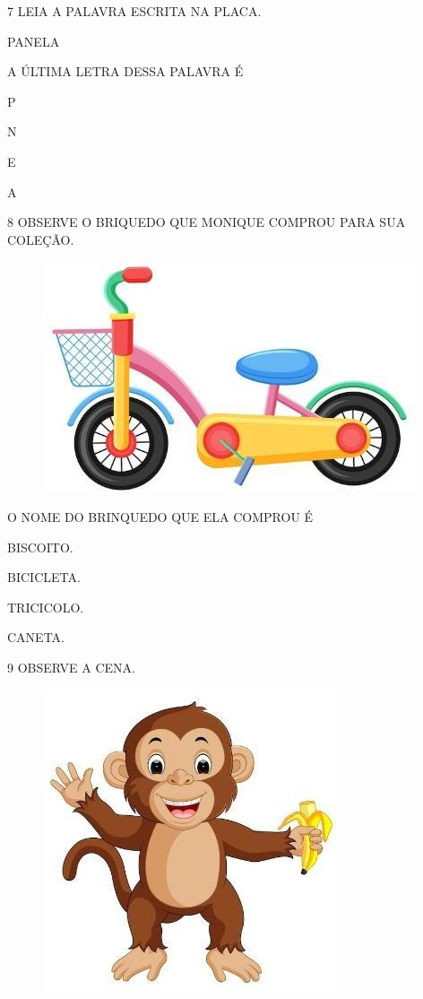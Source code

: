 \num{7} LEIA A PALAVRA ESCRITA NA PLACA.

\begin{myquote}
PANELA
\end{myquote}

A ÚLTIMA LETRA DESSA PALAVRA É

\begin{escolha}
\item P

\item N

\item E

\item A
\end{escolha}

\pagebreak

\num{8} OBSERVE O BRIQUEDO QUE MONIQUE COMPROU PARA SUA COLEÇÃO.

\begin{figure}[htpb]
\centering
\includegraphics[width=.3\textwidth]{media/image217.jpg}
\end{figure}

O NOME DO BRINQUEDO QUE ELA COMPROU É

\begin{escolha}
\item BISCOITO.

\item BICICLETA.

\item TRICICOLO.

\item CANETA.
\end{escolha}

\num{9} OBSERVE A CENA.

\begin{figure}[htpb]
\centering
\includegraphics[width=.3\textwidth]{media/image218.jpg}
\end{figure}

